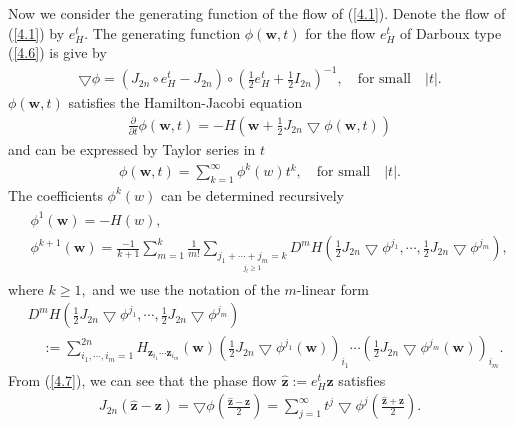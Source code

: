 \documentclass[a4paper,a4paper]{article}
\def\z{\boldsymbol{z}}
\def\ww{\boldsymbol{w}}
\begin{document}
Now we consider the generating function of the flow of (\ref{4.1}).  Denote
the flow of (\ref{4.1}) by $e^{t}_{H}$. The generating function $\phi(\ww,t)$ for
the flow   $e^{t}_{H}$ of Darboux type (\ref{4.6})  is give by
\begin{align}
  \bigtriangledown \phi=(J_{2n}\circ e^{t}_{H}-J_{2n})\circ \left(\frac{1}{2}
  e^{t}_{H}+\frac{1}{2}I_{2n}\right)^{-1}, \quad \text{for small} \quad |t|. \label{4.7}
\end{align}
$\phi(\ww, t)$ satisfies the Hamilton-Jacobi equation
\begin{align}
  \frac{\partial}{\partial t}\phi(\ww, t)=-H\left(\ww+\frac{1}{2}J_{2n}
   \bigtriangledown \phi(\ww, t)\right) \label{4.8}
\end{align}
and can be expressed by Taylor series in $t$
\begin{align}
 \phi(\ww, t)=\sum_{k=1}^{\infty}\phi^{k}(w)t^{k}, \quad \text{for small} \quad |t|.
 \label{4.9}
\end{align}
The coefficients $\phi^{k}(w)$ can be determined recursively
\begin{align}
\begin{split}
  &\phi^{1}(\ww)=-H(w),\\
  &\phi^{k+1}(\ww)=\frac{-1}{k+1}\sum_{m=1}^{k}\frac{1}{m!}\sum_{\underset
  {j_{l}\geqslant 1}{j_{1}+\cdots+j_{m}=k}}D^{m}H\left(\frac{1}{2}J_{2n}
  \bigtriangledown \phi^{j_{1}}, \cdots, \frac{1}{2}J_{2n}\bigtriangledown \phi
  ^{j_{m}}\right),
\end{split}\label{4.10}
\end{align}
where $ k\geqslant 1,$ and we use the notation of the $m$-linear form
\begin{align*}
  &D^{m}H\left(\frac{1}{2}J_{2n}
  \bigtriangledown \phi^{j_{1}}, \cdots, \frac{1}{2}J_{2n}\bigtriangledown \phi
  ^{j_{m}}\right) \\
  &\quad :=\sum_{i_{1}, \cdots, i_{m}=1}^{2n}H_{\z_{i_{1}}\cdots \z_{i_{m}}}
  (\ww)\left(\frac{1}{2}J_{2n}\bigtriangledown \phi^{j_{1}}(\ww)\right)_{i_{1}}\cdots
  \left(\frac{1}{2}J_{2n}\bigtriangledown \phi^{j_{m}}(\ww)\right)_{i_{m}}.
\end{align*}
From (\ref{4.7}), we can see that the phase flow $\hat{\z}:=e^{t}_{H}\z$ satisfies
\begin{align}
 J_{2n}(\hat{\z}-\z)=\bigtriangledown \phi\left(\frac{\hat{\z}-\z}{2}\right)=
     \sum_{j=1}^{\infty}t^{j}\bigtriangledown \phi^{j}
     \left(\frac{\hat{\z}+\z}{2}\right). \label{4.11}
\end{align}
\end{document}
